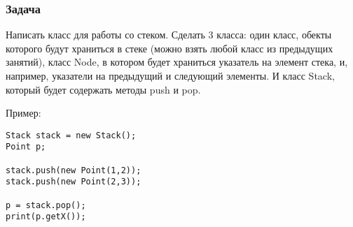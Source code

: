 \begin{frame}[fragile]
	\frametitle{Задача}
Написать класс для работы со стеком.
Сделать 3 класса: один класс, обекты которого будут храниться в стеке (можно взять любой класс из предыдущих занятий), класс Node, в котором будет храниться указатель на элемент стека, и, например, указатели на предыдущий и следующий элементы. И класс Stack, который будет содержать методы push и pop.

Пример:

\begin{verbatim}
Stack stack = new Stack();
Point p;

stack.push(new Point(1,2));
stack.push(new Point(2,3));

p = stack.pop();
print(p.getX());
\end{verbatim}

	
\end{frame}
